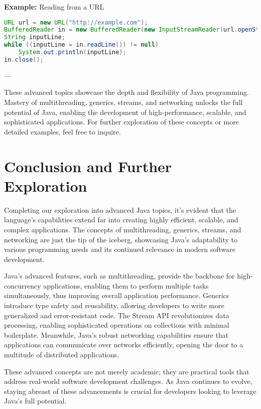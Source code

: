 \documentclass{article}
\begin{document}
\textbf{Example:} Reading from a URL
\begin{lstlisting}[language=Java]
URL url = new URL("http://example.com");
BufferedReader in = new BufferedReader(new InputStreamReader(url.openStream()));
String inputLine;
while ((inputLine = in.readLine()) != null)
    System.out.println(inputLine);
in.close();
\end{lstlisting}

---

These advanced topics showcase the depth and flexibility of Java programming. Mastery of multithreading, generics, streams, and networking unlocks the full potential of Java, enabling the development of high-performance, scalable, and sophisticated applications. For further exploration of these concepts or more detailed examples, feel free to inquire.


\section{Conclusion and Further Exploration}

Completing our exploration into advanced Java topics, it's evident that the language's capabilities extend far into creating highly efficient, scalable, and complex applications. The concepts of multithreading, generics, streams, and networking are just the tip of the iceberg, showcasing Java's adaptability to various programming needs and its continued relevance in modern software development.

Java's advanced features, such as multithreading, provide the backbone for high-concurrency applications, enabling them to perform multiple tasks simultaneously, thus improving overall application performance. Generics introduce type safety and reusability, allowing developers to write more generalized and error-resistant code. The Stream API revolutionizes data processing, enabling sophisticated operations on collections with minimal boilerplate. Meanwhile, Java’s robust networking capabilities ensure that applications can communicate over networks efficiently, opening the door to a multitude of distributed applications.

These advanced concepts are not merely academic; they are practical tools that address real-world software development challenges. As Java continues to evolve, staying abreast of these advancements is crucial for developers looking to leverage Java's full potential.

\newpage
\end{document}
